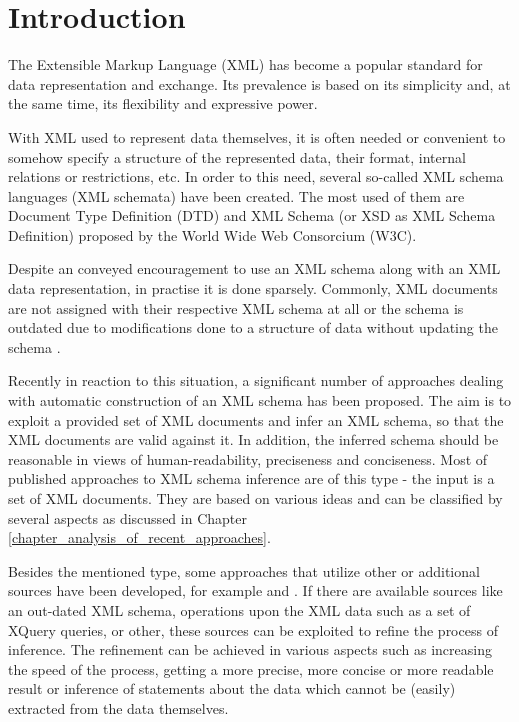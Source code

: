 \chapter{Introduction}
The Extensible Markup Language (XML) \cite{Bray:08:EML} has become a popular standard for data representation and exchange. Its prevalence is based on its simplicity and, at the same time, its flexibility and expressive power.

With XML used to represent data themselves, it is often needed or convenient to somehow specify a structure of the represented data, their format, internal relations or restrictions, etc. In order to this need, several so-called XML schema languages (XML schemata) have been created. The most used of them are Document Type Definition (DTD) \cite{Bray:08:EML} and XML Schema (or XSD as XML Schema Definition) \cite{Walmsley:04:XSP, Thompson:04:XSP, Malhotra:04:XSP} proposed by the World Wide Web Consorcium (W3C).

Despite an conveyed encouragement to use an XML schema along with an XML data representation, in practise it is done sparsely. Commonly, XML documents are not assigned with their respective XML schema at all or the schema is outdated due to modifications done to a structure of data without updating the schema \cite{Mlynkova:2008:AAX:1494650.1495496}.

Recently in reaction to this situation, a significant number of approaches dealing with automatic construction of an XML schema has been proposed. The aim is to exploit a provided set of XML documents and infer an XML schema, so that the XML documents are valid against it. In addition, the inferred schema should be reasonable in views of human-readability, preciseness and conciseness. Most of published approaches to XML schema inference are of this type - the input is a set of XML documents. They are based on various ideas and can be classified by several aspects as discussed in Chapter \ref{chapter_analysis_of_recent_approaches}.

Besides the mentioned type, some approaches that utilize other or additional sources have been developed, for example \cite{Mlynkova:2009:IXS:1862681.1862693} and \cite{thesis_klempa}. If there are available sources like an out-dated XML schema, operations upon the XML data such as a set of XQuery \cite{w3c_xquery} queries, or other, these sources can be exploited to refine the process of inference. The refinement can be achieved in various aspects such as increasing the speed of the process, getting a more precise, more concise or more readable result or inference of statements about the data which cannot be (easily) extracted from the data themselves.

